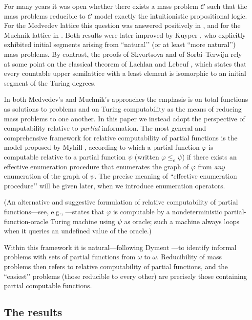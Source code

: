 \documentclass[11pt]{amsart}
\renewcommand{\phi}{\varphi}
\newcommand{\MP}[1]{\ensuremath{\mathcal{#1}}}
\begin{document}
For many years it was open whether there exists a mass problem $\MP{C}$ such 
that the mass problems reducible to $\MP{C}$ model exactly the intuitionistic 
propositional logic. For the Medvedev lattice this question was answered 
positively in \cite{Skvortsova:intuitionism}, and for the Muchnik lattice in 
\cite{Sorbi-Terwijn:factors}. Both results were later improved by Kuyper 
\cite{Kuyper-Muchnik, Kuyper-Medvedev}, who explicitly exhibited initial 
segments arising from “natural’’ (or at least “more natural’’) mass problems. 
By contrast, the proofs of Skvortsova and of Sorbi--Terwijn rely at some 
point on the classical theorem of Lachlan and Lebeuf \cite{Lachlan-Lebeuf}, 
which states that every countable upper semilattice with a least element is 
isomorphic to an initial segment of the Turing degrees. 

In both Medvedev’s and Muchnik’s approaches the emphasis is on total 
functions as solutions to problems and on Turing computability as the means 
of reducing mass problems to one another. In this paper we instead adopt the 
perspective of computability relative to \emph{partial} information. The most 
general and comprehensive framework for relative computability of partial 
functions is the model proposed by Myhill \cite{Myhill:Partial}, according to 
which a partial function $\phi$ is computable relative to a partial function 
$\psi$ (written $\phi \leq_e \psi$) if there exists an effective enumeration 
procedure that enumerates the graph of $\phi$ from \emph{any} enumeration of 
the graph of $\psi$. The precise meaning of “effective enumeration 
procedure’’ will be given later, when we introduce enumeration operators. 

(An alternative and suggestive formulation of relative computability of 
partial functions---see, e.g., \cite{McEvoy:Dissertation}---states that 
$\phi$ is computable by a nondeterministic partial-function-oracle Turing 
machine using $\psi$ as oracle; such a machine always loops when it queries 
an undefined value of the oracle.) 

Within this framework it is natural---following Dyment 
\cite{Dyment:Someproperties}---to identify informal problems with sets of 
partial functions from $\omega$ to $\omega$. Reducibility of mass problems 
then refers to relative computability of partial functions, and the 
“easiest’’ problems (those reducible to every other) are precisely those 
containing partial computable functions. 

\subsection{The results} 
\end{document}
